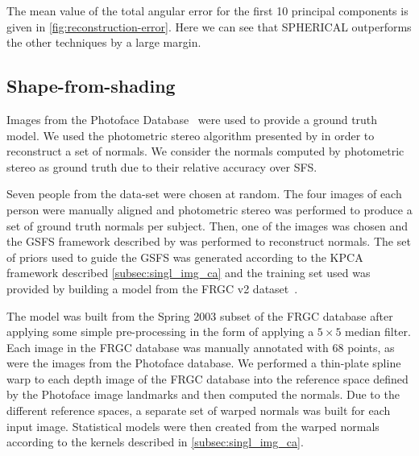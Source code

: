 The mean value of the total angular error for the first 10 principal
components is given in \cref{fig:reconstruction-error}. Here we can
see that SPHERICAL outperforms the other techniques by a large margin.
\subsection{Shape-from-shading}
Images from the Photoface Database~\cite{zafeiriou2013photoface} were used to provide a
ground truth model. We used the photometric stereo algorithm presented by
\citet{barsky2003foursource} in order to reconstruct a set of normals.
We consider the normals computed by photometric stereo as ground truth due to
their relative accuracy over SFS\@.

Seven people from the data-set were chosen at random. The four images of each
person were manually aligned and photometric stereo was performed to produce a
set of ground truth normals per subject. Then, one of the images was chosen
and the GSFS framework described by \citet{smith2006recovering,smith2008facial}
was performed to reconstruct normals. The set of priors used to guide the GSFS
was generated according to the KPCA framework described
\cref{subsec:singl_img_ca} and the training set used was provided by
building a model from the FRGC v2 dataset~\cite{phillips2005overview}.

The model was built from the Spring 2003 subset of the FRGC database after
applying some simple pre-processing in the form of applying a $5 \times 5$ median
filter. Each image in the FRGC
database was manually annotated with 68 points, as were the images from the
Photoface database. We performed a thin-plate spline warp to each depth image
of the FRGC database into the reference space defined
by the Photoface image landmarks and then computed the normals.
Due to the different reference spaces, a
separate set of warped normals was built for each input image. Statistical
models were then created from the warped normals according to the kernels
described in \cref{subsec:singl_img_ca}.

